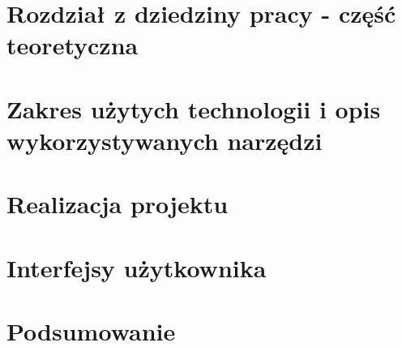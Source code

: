 \section{Rozdział z dziedziny pracy - część teoretyczna}

\newpage

\section{Zakres użytych technologii i opis wykorzystywanych narzędzi}

\newpage

\section{Realizacja projektu}

\newpage

\section{Interfejsy użytkownika}

\newpage

\section{Podsumowanie}

\newpage
